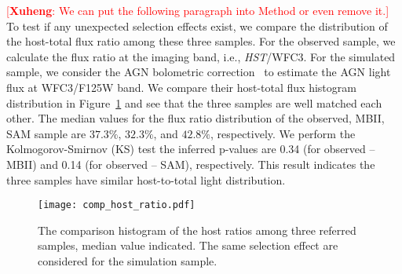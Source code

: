 \documentclass{natureprintstyle}
\newcommand{\hst}{{\it HST}}
\newcommand{\ding}[1]{\textcolor{red}{[{\bf Xuheng}: #1]}}
\begin{document}

 \ding{We can put the following paragraph into Method or even remove it.} To test if any unexpected selection effects exist, we compare the distribution of the host-total flux ratio among these three samples. For the observed sample, we calculate the flux ratio at the imaging band, i.e., \hst/WFC3. For the simulated sample, we consider the AGN bolometric correction~\cite{Elvis1994} to estimate the AGN light flux at WFC3/F125W band. We compare their host-total flux histogram distribution in Figure~\ref{fig:comp_hist} and see that the three samples are well matched each other. The median values for the flux ratio distribution of the observed, MBII, SAM sample are $37.3\%$, $32.3\%$, and $42.8\%$, respectively. We perform the Kolmogorov-Smirnov (KS) test the inferred p-values are 0.34 (for observed -- MBII) and 0.14 (for observed -- SAM), respectively. This result indicates the three samples have similar host-to-total light distribution.

\begin{figure}[t]
\texttt{[image: comp\_host\_ratio.pdf]}
\caption{The comparison histogram of the host ratios among three referred samples, median value indicated. The same selection effect are considered for the simulation sample.
}
\label{fig:comp_hist}
\end{figure}
\end{document}
